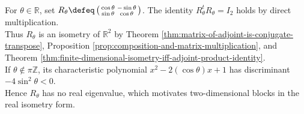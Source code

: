 \begin{example} \label{ex:plane-rotation-isometry} \\
For $\theta\in\mathbb{R}$, set $R_{\theta}\defeq\left(\begin{smallmatrix}\cos\theta&-\sin\theta\\\sin\theta&\cos\theta\end{smallmatrix}\right)$. The identity $R_{\theta}^tR_{\theta}=I_2$ holds by direct multiplication.\\
Thus $R_{\theta}$ is an isometry of $\mathbb{R}^2$ by Theorem \ref{thm:matrix-of-adjoint-is-conjugate-transpose}, Proposition \ref{prop:composition-and-matrix-multiplication}, and Theorem \ref{thm:finite-dimensional-isometry-iff-adjoint-product-identity}.\\
If $\theta\notin\pi\mathbb{Z}$, its characteristic polynomial $x^2-2(\cos\theta)x+1$ has discriminant $-4\sin^2\theta<0$.\\
Hence $R_{\theta}$ has no real eigenvalue, which motivates two-dimensional blocks in the real isometry form.
\end{example}

